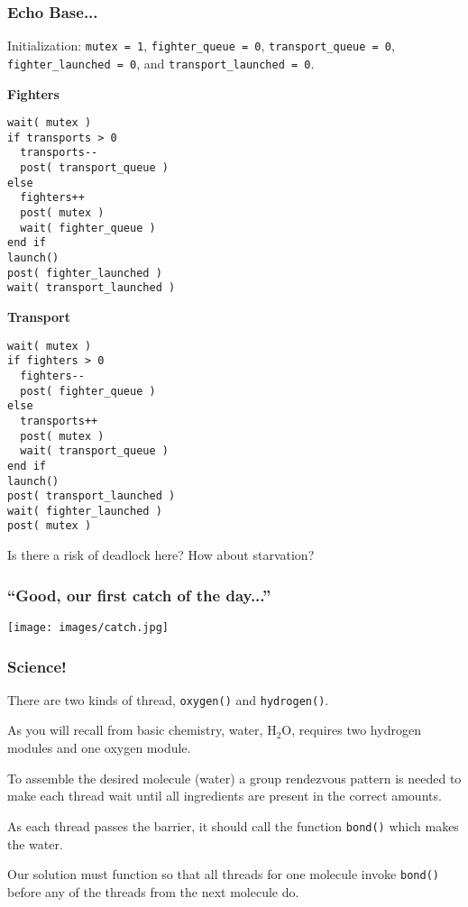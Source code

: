 \begin{frame}[fragile]
\frametitle{Echo Base...}

Initialization: \texttt{mutex = 1}, \texttt{fighter\_queue = 0}, \texttt{transport\_queue = 0}, \texttt{fighter\_launched = 0}, and \texttt{transport\_launched = 0}.

\begin{multicols}{2}
{\small
\textbf{Fighters}
\begin{verbatim}
wait( mutex )
if transports > 0
  transports--
  post( transport_queue )
else 
  fighters++
  post( mutex )
  wait( fighter_queue )
end if  
launch()
post( fighter_launched )
wait( transport_launched )
\end{verbatim}
\columnbreak
\textbf{Transport}
\begin{verbatim}
wait( mutex )
if fighters > 0
  fighters--
  post( fighter_queue )
else
  transports++
  post( mutex )
  wait( transport_queue )
end if
launch()
post( transport_launched )
wait( fighter_launched )
post( mutex )
\end{verbatim}}
\end{multicols}

Is there a risk of deadlock here? How about starvation?

\end{frame}


\begin{frame}
\frametitle{``Good, our first catch of the day...''}

\begin{center}
	\texttt{[image: images/catch.jpg]}
\end{center}

\end{frame}


\begin{frame}
	\frametitle{Science!}

	There are two kinds of thread, \texttt{oxygen()} and \texttt{hydrogen()}.

	As you will recall from basic chemistry, water, H$_{2}$O, requires two hydrogen modules and one oxygen module.

	To assemble the desired molecule (water) a group rendezvous pattern is needed to make each thread wait until all ingredients are present in the correct amounts.

	As each thread passes the barrier, it should call the function \texttt{bond()} which makes the water.

	Our solution must function so that all threads for one molecule invoke \texttt{bond()} before any of the threads from the next molecule do.

\end{frame}


